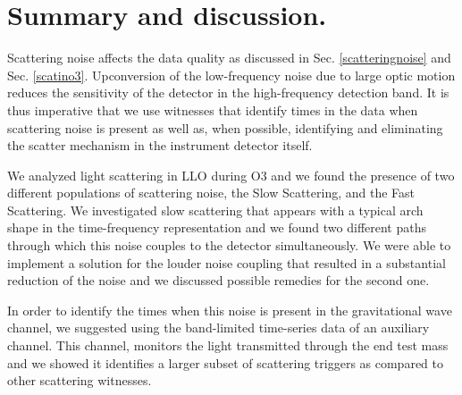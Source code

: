 \documentclass[12pt]{iopart}
\begin{document}
\newpage
\section{Summary and discussion.}\label{summary}
 Scattering noise affects the data quality as discussed in Sec. \ref{scatteringnoise} and Sec. \ref{scatino3}. Upconversion of the low-frequency noise due to large optic motion reduces the sensitivity of the detector in the high-frequency detection band. It is thus imperative that we use witnesses that identify times in the data when scattering noise is present as well as, when possible, identifying and eliminating the scatter mechanism in the instrument detector itself. 

We analyzed light scattering in LLO during O3 and we found the presence of two different populations of scattering noise, the Slow Scattering, and the Fast Scattering. We investigated slow scattering that appears with a typical arch shape in the time-frequency representation and we found two different paths through which this noise couples to the detector simultaneously. We were able to implement a solution for the louder noise coupling that resulted in a substantial reduction of the noise and we discussed possible remedies for the second one. 

In order to identify the times when this noise is present in the gravitational wave channel, we suggested using the band-limited time-series data of an auxiliary channel. This channel, monitors the light transmitted through the end test mass and we showed it identifies a larger subset of scattering triggers as compared to other scattering witnesses.


  




%
%
\end{document}
